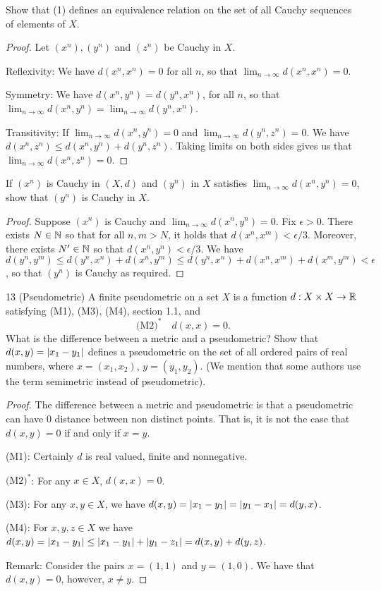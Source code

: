 \begin{exercise}{11}
Show that (1) defines an equivalence relation on the set of all Cauchy sequences of elements of $X$.
\end{exercise}
\begin{proof}
Let $(x^n), (y^n)$ and $(z^n)$ be Cauchy in $X$.

Reflexivity: We have $d(x^n,x^n)=0$ for all $n$, so that $\lim_{n\to\infty}d(x^n,x^n)=0$.

Symmetry: We have $d(x^n,y^n)=d(y^n,x^n)$, for all $n$, so that $\lim_{n\to\infty}d(x^n,y^n)=\lim_{n\to\infty}d(y^n,x^n)$.

Transitivity: If $\lim_{n\to\infty}d(x^n,y^n)=0$ and $\lim_{n\to\infty}d(y^n,z^n)=0$. We have $d(x^n,z^n)\leq d(x^n,y^n)+d(y^n,z^n)$. Taking limits on both sides gives us that $\lim_{n\to\infty}d(x^n,z^n)=0$.
\end{proof}

\begin{exercise}{12}
If $(x^n)$ is Cauchy in $(X,d)$ and $(y^n)$ in $X$ satisfies $\lim_{n\to\infty}d(x^n,y^n)=0$, show that $(y^n)$ is Cauchy in $X$.
\end{exercise}
\begin{proof}
Suppose $(x^n)$ is Cauchy and $\lim_{n\to\infty}d(x^n,y^n)=0$. Fix $\epsilon>0$. There exists $N\in\mathbb{N}$ so that for all $n,m>N$, it holds that $d(x^n,x^m)<\epsilon/3$. Moreover, there exists $N'\in\mathbb{N}$ so that $d(x^n,y^n)<\epsilon/3$. We have $d(y^n,y^m)\leq d(y^n,x^n)+d(x^n,y^m)\leq d(y^n,x^n)+d(x^n,x^m)+d(x^m,y^m)<\epsilon$, so that $(y^n)$ is Cauchy as required.
\end{proof}

\begin{exercise}{13 (Pseudometric)}
A finite pseudometric on a set $X$ is a function $d:X\times X\to\mathbb{R}$ satisfying (M1), (M3), (M4), section 1.1, and 
\[
\text{(M2)}^\ast\quad d(x,x)=0.
\]
What is the difference between a metric and a pseudometric? Show that $d(x,y)=\left\lvert x_1-y_1\right\rvert$ defines a pseudometric on the set of all ordered pairs of real numbers, where $x=(x_1,x_2)$, $y=(y_1,y_2)$. (We mention that some authors use the term semimetric instead of pseudometric).
\end{exercise}
\begin{proof}
The difference between a metric and pseudometric is that a pseudometric can have 0 distance between non distinct points. That is, it is not the case that $d(x,y)=0$ if and only if $x=y$.

(M1): Certainly $d$ is real valued, finite and nonnegative. 

$\text{(M2)}^\ast$: For any $x\in X$, $d(x,x)=0$.

(M3): For any $x,y\in X$, we have $d(x,y)=\left\lvert x_1-y_1\right\rvert=\left\lvert y_1-x_1\right\rvert=d(y,x)$.

(M4): For $x,y,z\in X$ we have $d(x,y)=\left\lvert x_1-y_1\right\rvert\leq \left\lvert x_1-y_1\right\rvert+\left\lvert y_1-z_1\right\rvert=d(x,y)+d(y,z)$.

Remark: Consider the pairs $x=(1,1)$ and $y=(1,0)$. We have that $d(x,y)=0$, however, $x\neq y$.
\end{proof}

